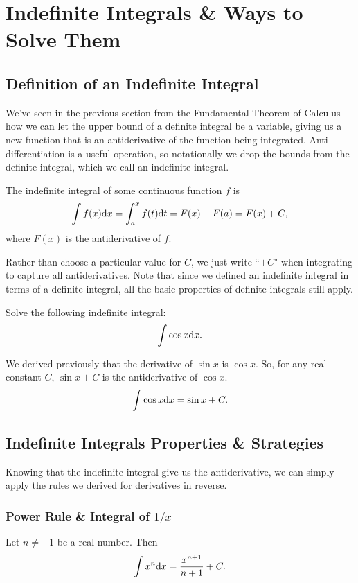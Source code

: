 \section{Indefinite Integrals \& Ways to Solve Them}

\subsection{Definition of an Indefinite Integral}
We've seen in the previous section from the Fundamental Theorem of Calculus how we can let the upper bound of a definite integral be a variable, giving us a new function that is an antiderivative of the function being integrated.
Anti-differentiation is a useful operation, so notationally we drop the bounds from the definite integral, which we call an indefinite integral.
\begin{definition}
	The indefinite integral of some continuous function $f$ is
	\begin{equation*}
		\int{f(x)\mathrm{d} x} = \int_{a}^{x}{f(t)\mathrm{d} t} = F(x) - F(a) = F(x) + C,
	\end{equation*}
	where $F(x)$ is the antiderivative of $f$.
\end{definition}
\noindent
Rather than choose a particular value for $C$, we just write ``$+C$" when integrating to capture all antiderivatives.
Note that since we defined an indefinite integral in terms of a definite integral, all the basic properties of definite integrals still apply.

\begin{example}
	Solve the following indefinite integral:
	\begin{equation*}
		\int{\cos{x}\mathrm{d} x}.
	\end{equation*}
\end{example}
We derived previously that the derivative of $\sin{x}$ is $\cos{x}$.
So, for any real constant $C$, $\sin{x} + C$ is the antiderivative of $\cos{x}$.
\begin{equation*}
	\int{\cos{x}\mathrm{d} x} = \sin{x} + C.
\end{equation*}

\subsection{Indefinite Integrals Properties \& Strategies}
Knowing that the indefinite integral give us the antiderivative, we can simply apply the rules we derived for derivatives in reverse.

\subsubsection{Power Rule \& Integral of $1/x$}
\begin{lemma}
	Let $n \neq -1$ be a real number.
	Then
	\begin{equation*}
		\int{x^n \mathrm{d} x} = \frac{x^{n+1}}{n+1} + C.
	\end{equation*}
\end{lemma}


